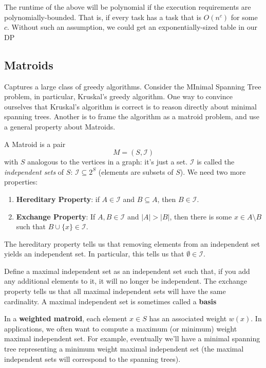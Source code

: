 \documentclass{article}
\begin{document}
The runtime of the above will be polynomial if the execution requirements
are polynomially-bounded.
That is, if every task has a task that is $O(n^c)$ for some $c$.
Without such an assumption, we could get an exponentially-sized
table in our DP


\subsection{Matroids}

Captures a large class of greedy algorithms.
Consider the MInimal Spanning Tree problem, in particular, Kruskal's
greedy algorithm.
One way to convince ourselves that Kruskal's algorithm is correct
is to reason directly about minimal spanning trees.
Another is to frame the algorithm as a matroid problem, and use a general
property about Matroids.

A Matroid is a pair
$$
M = (S,\mathcal I)
$$
with $S$ analogous to the vertices in a graph: it's just a set.
$\mathcal I$ is called the \emph{independent sets} of $S$: $\mathcal I \subseteq 2^S$ (elements are subsets of $S$).
We need two more properties:
\begin{enumerate}
	\item
	\textbf{Hereditary Property}: if $A\in\mathcal I$ and $B\subseteq A$, 
	then $B\in\mathcal I$.
	
	\item
	\textbf{Exchange Property}:
	If $A,B\in \mathcal I$ and $|A| > |B|$, then
	there is some $x \in A\setminus B$ such that $B\cup\{x\} \in \mathcal I$.
\end{enumerate}
The hereditary property tells us that removing elements from an independent
set yields an independent set.
In particular, this tells us that $\emptyset\in\mathcal I$.

Define a maximal independent set as an independent set such that, if you
add any additional elements to it, it will no longer be independent.
The exchange property tells us that all maximal independent sets
will have the same cardinality.
A maximal independent set is sometimes called a \textbf{basis}

In a \textbf{weighted matroid}, each element $x\in S$ has an associated
weight $w(x)$.
In applications, we often want to compute a maximum (or minimum) weight
maximal independent set.
For example, eventually we'll have a minimal spanning tree representing a
minimum weight maximal independent set (the maximal independent sets will
correspond to the spanning trees).
\end{document}
